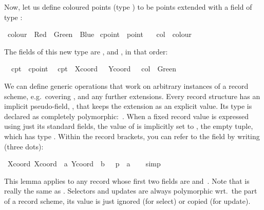 \begin{isabellebody}
\begin{isamarkuptext}
  Now, let us define coloured points (type ) to be
  points extended with a field  of type :%
\end{isamarkuptext}%
\isamarkuptrue%
\ colour\ {\isacharequal}\ Red\ {\isacharbar}\ Green\ {\isacharbar}\ Blue\isanewline
\isanewline
\isamarkupfalse%
\ cpoint\ {\isacharequal}\ point\ {\isacharplus}\isanewline
\ \ col\ {\isacharcolon}{\isacharcolon}\ colour\isamarkupfalse%
%
\begin{isamarkuptext}%
The fields of this new type are ,  and
  , in that order:%
\end{isamarkuptext}%
\isamarkuptrue%
\isanewline
\ \ cpt{}\ {\isacharcolon}{\isacharcolon}\ cpoint\isanewline
\ \ {\isachardoublequote}cpt{}\ {\isasymequiv}\ {\isasymlparr}Xcoord\ {\isacharequal}\ {}{}{}{\isacharcomma}\ Ycoord\ {\isacharequal}\ {}{}{\isacharcomma}\ col\ {\isacharequal}\ Green{\isasymrparr}{\isachardoublequote}\isamarkupfalse%
%
\begin{isamarkuptext}%
We can define generic operations that work on arbitrary instances of
  a record scheme, e.g.\ covering ,  and any
  further extensions.  Every record structure has an implicit
  pseudo-field, , that keeps the extension as an explicit
  value.  Its type is declared as completely polymorphic:~.
  When a fixed record value is expressed using just its standard
  fields, the value of  is implicitly set to \isa{{\isacharparenleft}{\isacharparenright}},
  the empty tuple, which has type .  Within the record
  brackets, you can refer to the  field by writing \isa{{\isasymdots}} (three dots):%
\end{isamarkuptext}%
\isamarkuptrue%
\ {\isachardoublequote}Xcoord\ {\isasymlparr}Xcoord\ {\isacharequal}\ a{\isacharcomma}\ Ycoord\ {\isacharequal}\ b{\isacharcomma}\ {\isasymdots}\ {\isacharequal}\ p{\isasymrparr}\ {\isacharequal}\ a{\isachardoublequote}\isanewline
\ \ \isamarkupfalse%
\ simp\isamarkupfalse%
%
\begin{isamarkuptext}%
This lemma applies to any record whose first two fields are  and~.  Note that  is really the same as .  Selectors and updates are always polymorphic wrt.\ the  part of a record scheme, its value is just ignored (for
  select) or copied (for update).


\end{isamarkuptext}
\end{isabellebody}
